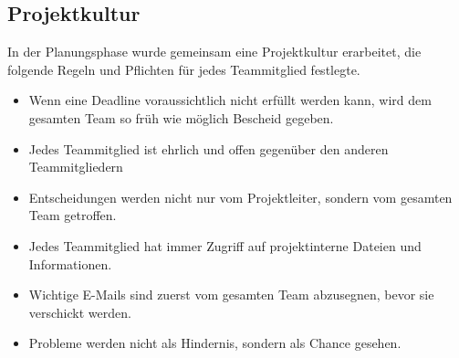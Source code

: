   \subsection{Projektkultur}
  In der Planungsphase wurde gemeinsam eine Projektkultur erarbeitet, die folgende Regeln und Pflichten
  für jedes Teammitglied festlegte.
  \begin{itemize}
    \item Wenn eine Deadline voraussichtlich nicht erfüllt werden kann, wird dem gesamten Team so früh wie möglich Bescheid gegeben.
    \item Jedes Teammitglied ist ehrlich und offen gegenüber den anderen Teammitgliedern
    \item Entscheidungen werden nicht nur vom Projektleiter, sondern vom gesamten Team getroffen.
    \item Jedes Teammitglied hat immer Zugriff auf projektinterne Dateien und Informationen.
    \item Wichtige E-Mails sind zuerst vom gesamten Team abzusegnen, bevor sie verschickt werden.
    \item Probleme werden nicht als Hindernis, sondern als Chance gesehen.
  \end{itemize}
